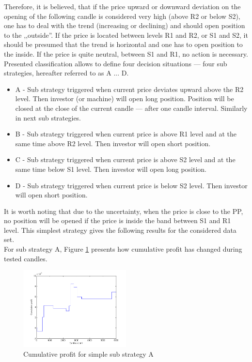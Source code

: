 \documentclass{jtacs}
\begin{document}
Therefore, it is believed, that if the price upward or downward deviation on the opening of the following candle is considered very high (above R2 or below S2), one has to deal with the trend (increasing or declining) and should open position to the ,,outside''. If the price is located between levels R1 and R2, or S1 and S2, it should be presumed that the trend is horizontal and one has to open position to  the inside. If the price is quite neutral, between S1 and R1, no action is necessary.\\

Presented classification allows to define four decision situations --- four sub strategies, hereafter referred to as A ... D.
\begin{itemize}
\item A - Sub strategy triggered when current price deviates upward above the R2 level. Then investor (or machine) will open long position. Position will be closed at the close of the current candle --- after one candle interval. Similarly in next sub strategies.
\item B - Sub strategy triggered when current price is above R1 level and at the same time above R2 level. Then investor will open short position.
\item C - Sub strategy triggered when current price is above S2 level and at the same time below S1 level. Then investor will open long position.
\item D - Sub strategy triggered when current price is below S2 level. Then investor will open short position.
\end{itemize}
It is worth noting that due to the uncertainty, when the price is close to the PP, no position will be opened if the price is inside the band between S1 and R1 level. This simplest strategy gives the following results for the considered data set. \\

For sub strategy A, Figure \ref{rys3} presents how cumulative profit has changed during tested candles. 
\begin{figure}[ht]
\centering
\includegraphics[width = 0.5\textwidth]{pictures/PivotPointsAp.png}
\caption{Cumulative profit for simple sub strategy A}
\label{rys3}
\end{figure}
\FloatBarrier
\end{document}
